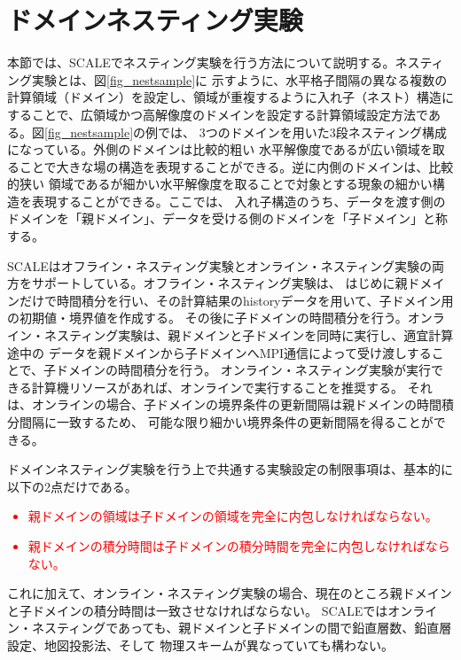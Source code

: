 \section{ドメインネスティング実験} \label{sec:nest_exp}

本節では、SCALEでネスティング実験を行う方法について説明する。ネスティング実験とは、図\ref{fig_nestsample}に
示すように、水平格子間隔の異なる複数の計算領域（ドメイン）を設定し、領域が重複するように入れ子（ネスト）構造に
することで、広領域かつ高解像度のドメインを設定する計算領域設定方法である。図\ref{fig_nestsample}の例では、
3つのドメインを用いた3段ネスティング構成になっている。外側のドメインは比較的粗い
水平解像度であるが広い領域を取ることで大きな場の構造を表現することができる。逆に内側のドメインは、比較的狭い
領域であるが細かい水平解像度を取ることで対象とする現象の細かい構造を表現することができる。ここでは、
入れ子構造のうち、データを渡す側のドメインを「親ドメイン」、データを受ける側のドメインを「子ドメイン」と称する。

SCALEはオフライン・ネスティング実験とオンライン・ネスティング実験の両方をサポートしている。オフライン・ネスティング実験は、
はじめに親ドメインだけで時間積分を行い、その計算結果のhistoryデータを用いて、子ドメイン用の初期値・境界値を作成する。
その後に子ドメインの時間積分を行う。オンライン・ネスティング実験は、親ドメインと子ドメインを同時に実行し、適宜計算途中の
データを親ドメインから子ドメインへMPI通信によって受け渡しすることで、子ドメインの時間積分を行う。
オンライン・ネスティング実験が実行できる計算機リソースがあれば、オンラインで実行することを推奨する。
それは、オンラインの場合、子ドメインの境界条件の更新間隔は親ドメインの時間積分間隔に一致するため、
可能な限り細かい境界条件の更新間隔を得ることができる。


ドメインネスティング実験を行う上で共通する実験設定の制限事項は、基本的に以下の2点だけである。
\textcolor{red}{
\begin{itemize}
 \item 親ドメインの領域は子ドメインの領域を完全に内包しなければならない。
 \item 親ドメインの積分時間は子ドメインの積分時間を完全に内包しなければならない。
\end{itemize}
}

これに加えて、オンライン・ネスティング実験の場合、現在のところ親ドメインと子ドメインの積分時間は一致させなければならない。
SCALEではオンライン・ネスティングであっても、親ドメインと子ドメインの間で鉛直層数、鉛直層設定、地図投影法、そして
物理スキームが異なっていても構わない。

